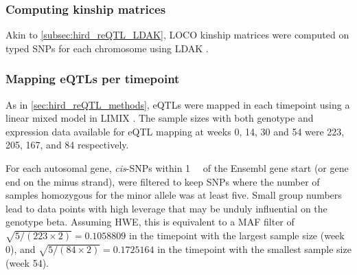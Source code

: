\subsubsection{Computing kinship matrices}

Akin to \cref{subsec:hird_reQTL_LDAK}, \gls{LOCO} kinship matrices were computed on typed \glspl{SNP} for each chromosome using LDAK \autocite{speed2012ImprovedHeritabilityEstimation}.

\subsubsection{Mapping eQTLs per timepoint}

As in \cref{sec:hird_reQTL_methods},
\glspl{eQTL} were mapped in each timepoint using a linear mixed model in {LIMIX} \autocite{lippert2014LIMIXGeneticAnalysis}.
%
%
The sample sizes with both genotype and expression data available for \gls{eQTL} mapping at weeks 0, 14, 30 and 54 were 223, 205, 167, and 84 respectively.

%
For each autosomal gene, \textit{cis}-\glspl{SNP} within \SI{1}{\mega\bp} of the Ensembl gene start (or gene end on the minus strand),
were filtered to keep \glspl{SNP} where the number of samples homozygous for the minor allele was at least five.
Small group numbers lead to data points with high leverage that may be unduly influential on the genotype beta.
Assuming \gls{HWE}, this is equivalent to a \gls{MAF} filter of 
$\sqrt{5/(223\times2)} = \num{0.1058809}$ in the timepoint with the largest sample size (week 0),
and $\sqrt{5/(84\times2)} = \num{0.1725164}$ in the timepoint with the smallest sample size (week 54).

